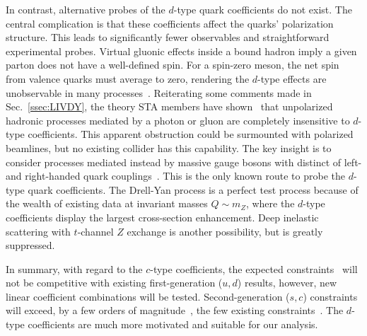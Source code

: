 In contrast, alternative probes of 
the $d$-type quark coefficients do not exist.
The central complication is 
that these coefficients affect the quarks' polarization structure.
This leads to significantly fewer observables 
and straightforward experimental probes.
Virtual gluonic effects inside
a bound hadron imply a given parton 
does not have a well-defined spin.
For a spin-zero meson, the net spin from 
valence quarks must 
average to zero, rendering the $d$-type effects
are unobservable in many processes~\cite{Altschul:2020wkw}.
Reiterating some comments made in 
Sec.~\ref{ssec:LIVDY},
the theory STA members 
have shown~\cite{ls18} that
unpolarized hadronic processes
mediated by a photon or gluon
are completely insensitive to $d$-type coefficients.
This apparent obstruction could be surmounted
with polarized beamlines, but no existing
collider has this capability.
The key insight is to consider processes
mediated instead by massive gauge bosons
with distinct of left- and right-handed
quark couplings~\cite{lssv21}. 
This is the only known route to 
probe the $d$-type quark coefficients.
The Drell-Yan process is a perfect test process
because of the wealth of existing data 
at invariant masses $Q\sim m_Z$, where
the $d$-type coefficients display the 
largest cross-section enhancement.
Deep inelastic scattering with $t$-channel $Z$ exchange
is another possibility, but is greatly suppressed.

In summary, with regard to the
$c$-type coefficients, the 
expected constraints~\cite{ls18,klsv19}
will not be competitive with existing 
first-generation ($u,d$) results, however,
new linear coefficient combinations will be tested.
Second-generation ($s,c$)
constraints will exceed, 
by a few orders of magnitude~\cite{lssv21},
the few existing constraints~\cite{Karpikov:2016qvq}.
The $d$-type coefficients are much more
motivated and suitable for our analysis.
